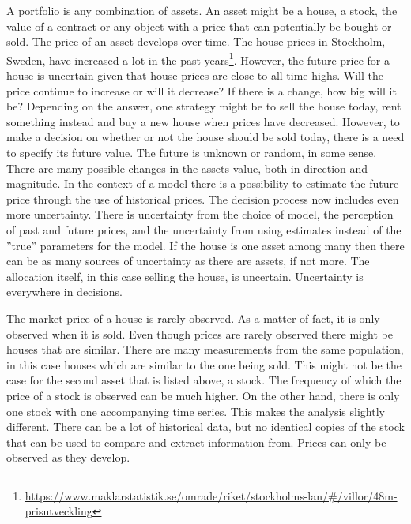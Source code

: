 A portfolio is any combination of assets.
An asset might be a house, a stock, the value of a contract or any object with a price that can potentially be bought or sold.
The price of an asset develops over time.
The house prices in Stockholm, Sweden, have increased a lot in the past years\footnote{\url{https://www.maklarstatistik.se/omrade/riket/stockholms-lan/\#/villor/48m-prisutveckling}}.
However, the future price for a house is uncertain given that house prices are close to all-time highs.
Will the price continue to increase or will it decrease?
If there is a change, how big will it be?
Depending on the answer, one strategy might be to sell the house today, rent something instead and buy a new house when prices have decreased.
However, to make a decision on whether or not the house should be sold today, there is a need to specify its future value. 
The future is unknown or random, in some sense.
There are many possible changes in the assets value, both in direction and magnitude.
In the context of a model there is a possibility to estimate the future price through the use of historical prices.
The decision process now includes even more uncertainty.
There is uncertainty from the choice of model, the perception of past and future prices, and the uncertainty from using estimates instead of the ''true'' parameters for the model.
If the house is one asset among many then there can be as many sources of uncertainty as there are assets, if not more.
The allocation itself, in this case selling the house, is uncertain.
Uncertainty is everywhere in decisions.

The market price of a house is rarely observed.
As a matter of fact, it is only observed when it is sold.
Even though prices are rarely observed there might be houses that are similar.
There are many measurements from the same population, in this case houses which are similar to the one being sold. 
This might not be the case for the second asset that is listed above, a stock.
The frequency of which the price of a stock is observed can be much higher.
On the other hand, there is only one stock with one accompanying time series.
This makes the analysis slightly different.
There can be a lot of historical data, but no identical copies of the stock that can be used to compare and extract information from.
Prices can only be observed as they develop.


